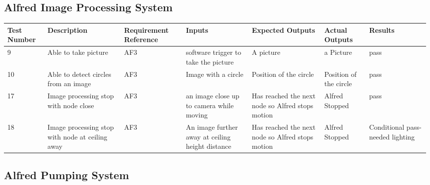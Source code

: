 \documentclass [10pt]{article}
\begin{document}
\subsection {Alfred Image Processing System}
\begin{longtable}{| p{} | p{} | p{} | p{} | p{} | p{} | p{} |}\hline 
\rowcolor{tableCell}\textbf{Test Number} & \textbf{Description} & \textbf{Requirement Reference} & \textbf{Inputs} & \textbf{Expected Outputs} & \textbf{Actual Outputs}& \textbf{Results} \\ \hline

	9 &  Able to take picture &  AF3 & software trigger to take the picture &  A picture &  a Picture &  pass
\\ \hline
10 &  Able to detect circles from an image &  AF3 &  Image with a circle &  Position of the circle &  Position of the circle &  pass
\\ \hline
	17 &  Image processing stop with node close &  AF3 &  an image close up to camera while moving &  Has reached the next node so Alfred stops motion &  Alfred Stopped &  pass 
	\\ \hline
	18 &  Image processing stop with node at ceiling away &  AF3 &  An image further away at ceiling height distance &  Has reached the next node so Alfred stops motion &  Alfred Stopped &  Conditional pass- needed lighting
	\\ \hline
	
	\end{longtable}






\subsection {Alfred Pumping System}
\end{document}
